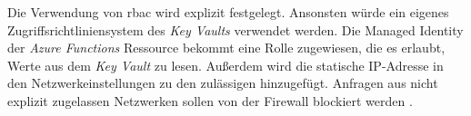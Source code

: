 Die Verwendung von \ac{rbac} wird explizit festgelegt. Ansonsten würde ein eigenes Zugriffsrichtliniensystem des \textit{Key Vaults} verwendet werden. Die Managed Identity der \textit{Azure Functions} Ressource bekommt eine Rolle zugewiesen, die es erlaubt, Werte aus dem \textit{Key Vault} zu lesen. Außerdem wird die statische IP-Adresse in den Netzwerkeinstellungen zu den zulässigen hinzugefügt. Anfragen aus nicht explizit zugelassen Netzwerken sollen von der Firewall blockiert werden \cite[vgl.][]{herath_working_2022}.